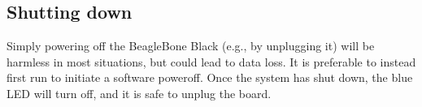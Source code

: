 \documentclass[a4paper,10pt]{article}
\begin{document}
%
%
%
%

\subsection*{Shutting down}

Simply powering off the BeagleBone Black (e.g., by unplugging it) will be
harmless in most situations, but could lead to data loss.
It is preferable to instead first run  to initiate a
software poweroff.
Once the system has shut down, the blue LED will turn off, and it is safe to
unplug the board.
\end{document}
